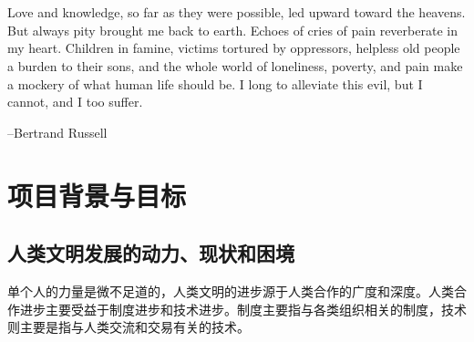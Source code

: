 \documentclass[a4paper,12pt]{article}
\begin{document}
\medskip
\noindent
 \\\\
\medskip
\noindent

\thispagestyle{empty}

\newpage
\thispagestyle{empty}

\noindent



\vspace{-2in}
Love and knowledge, so far as they were possible, led upward toward the heavens. But always pity brought me back to earth. Echoes of cries of pain reverberate in my heart. Children in famine, victims tortured by oppressors, helpless old people a burden to their sons, and the whole world of loneliness, poverty, and pain make a mockery of what human life should be. I long to alleviate this evil, but I cannot, and I too suffer.
\singlespacing

\begin{flushright}
--Bertrand Russell
\end{flushright}

\newpage
\setcounter{page}{1}
\renewcommand{\contentsname}{\centerline{目\  录}}
\tableofcontents

\newpage

\clearpage

\onehalfspacing

\setcounter{footnote}{0}
\renewcommand{\thefootnote}{\arabic{footnote}}


\setcounter{page}{1}


\pagestyle{fancy}

\cfoot{}



\section{项目背景与目标}
\subsection{人类文明发展的动力、现状和困境}                    

单个人的力量是微不足道的，人类文明的进步源于人类合作的广度和深度。人类合作进步主要受益于制度进步和技术进步。制度主要指与各类组织相关的制度，技术则主要是指与人类交流和交易有关的技术。
\end{document}

